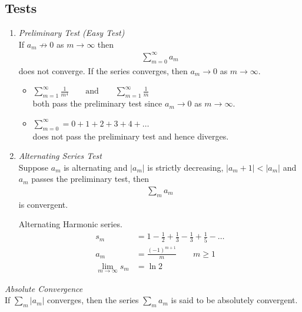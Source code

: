 \subsection{Tests}
\begin{enumerate}
	\item
	\emph{Preliminary Test (Easy Test)} \\
	If $a_m \not \to 0$ as $m \to \infty$ then 
	\begin{align*}
	\sum_{m=0}^\infty a_m 
	\end{align*}
	does not converge.
	If the series converges, then $a_m \to 0$ as $m \to \infty$.
	\begin{ex}
		\begin{itemize}
			\item
			$\displaystyle
			\sum_{m=1}^\infty \frac 1 {m^4} \qquad \text{and} \qquad  \sum_{m=1}^\infty \frac 1 {m}
			$ \\
		both pass the preliminary test since $a_m \to 0$ as $m \to \infty$.
		\item
		$\displaystyle
			\sum_{m=0}^\infty = 0+1+2+3+4+ \dots
		$ \\
		does not pass the preliminary test and hence diverges.
	\end{itemize}
	\end{ex}
	\item
	\emph{Alternating Series Test} \\
	Suppose $a_m$ is alternating and $|a_m|$ is strictly decreasing, $|a_m+1| < |a_m|$ and $a_m$ passes the preliminary test, then 
	\begin{align*}
	\sum_m a_m
	\end{align*}
	is convergent.
	\begin{ex} Alternating Harmonic series.
		\begin{align*}
			s_m & = 1- \frac 1 2 + \frac 1 3 - \frac 1 3 + \frac 1 5 - \dots \\
			a_m & = \frac{(-1)^{m+1}}{m} \qquad m \ge 1 \\
			\lim_{m \to \infty} s_m & = \ln 2
		\end{align*}
	\end{ex}
\end{enumerate}

\begin{df}\emph{Absolute Convergence} \\
If $\displaystyle \sum_m |a_m|$ converges, then the series $\displaystyle \sum_m a_m$ is said to be absolutely convergent.
\end{df}

